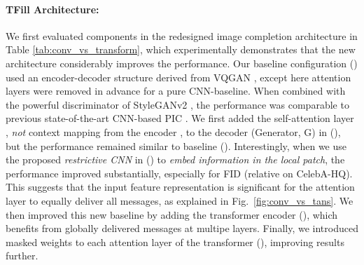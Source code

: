 \documentclass[10pt,twocolumn,letterpaper]{article}
\begin{document}
\vspace{-0.2cm}\paragraph{TFill Architecture:} We first evaluated components in the redesigned image completion architecture in Table \ref{tab:conv_vs_transform}, which experimentally demonstrates that the new architecture considerably improves the performance. Our baseline configuration () used an encoder-decoder structure derived from VQGAN \cite{esser2020taming}, except here attention layers were removed in advance for a pure CNN-baseline. When combined with the powerful discriminator of StyleGANv2 \cite{karras2020analyzing}, the performance was comparable to previous state-of-the-art CNN-based PIC \cite{Zheng_2019_CVPR,zheng2021pluralistic}. We first added the self-attention layer \cite{zhang2019self}, \emph{not} context mapping from the encoder \cite{yu2018generative,Zheng_2019_CVPR}, to the decoder (Generator, G) in (), but the performance remained similar to baseline (). Interestingly, when we use the proposed \emph{restrictive CNN} in () to \emph{embed information in the local patch}, the performance improved substantially, especially for FID (relative  on CelebA-HQ). This suggests that the input feature representation is significant for the attention layer to equally deliver all messages, as explained in Fig.\ \ref{fig:conv_vs_tans}. We then improved this new baseline by adding the transformer encoder (), which benefits from globally delivered messages at multipe layers. Finally, we introduced masked weights to each attention layer of the transformer (), improving results further.
\end{document}
